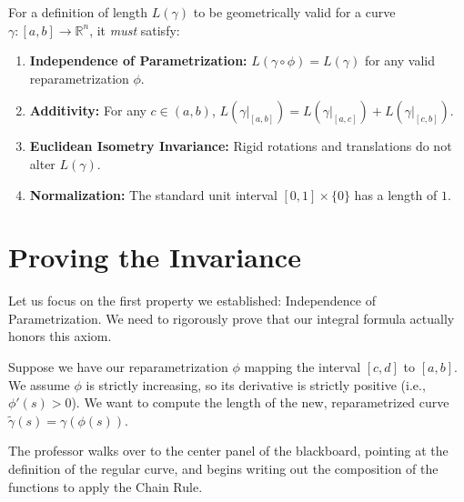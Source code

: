 \begin{orangeformula}
\begin{definition}
For a definition of length $L(\gamma)$ to be geometrically valid for a curve $\gamma: [a, b] \to \mathbb{R}^n$, it \textit{must} satisfy:
\begin{enumerate}
    \item \textbf{Independence of Parametrization:} $L(\gamma \circ \phi) = L(\gamma)$ for any valid reparametrization $\phi$.
    \item \textbf{Additivity:} For any $c \in (a, b)$, $L(\gamma|_{[a, b]}) = L(\gamma|_{[a, c]}) + L(\gamma|_{[c, b]})$.
    \item \textbf{Euclidean Isometry Invariance:} Rigid rotations and translations do not alter $L(\gamma)$.
    \item \textbf{Normalization:} The standard unit interval $[0,1] \times \{0\}$ has a length of $1$.
\end{enumerate}
\end{definition}
\end{orangeformula}



\section{Proving the Invariance}

\begin{spokenclean}[00:15:00 - 00:16:30]
Let us focus on the first property we established: Independence of Parametrization. We need to rigorously prove that our integral formula actually honors this axiom. 

Suppose we have our reparametrization $\phi$ mapping the interval $[c, d]$ to $[a, b]$. We assume $\phi$ is strictly increasing, so its derivative is strictly positive (i.e., $\phi'(s) > 0$). We want to compute the length of the new, reparametrized curve $\tilde{\gamma}(s) = \gamma(\phi(s))$. 
\end{spokenclean}

\begin{nicebox}
The professor walks over to the center panel of the blackboard, pointing at the definition of the regular curve, and begins writing out the composition of the functions to apply the Chain Rule.
\end{nicebox}

